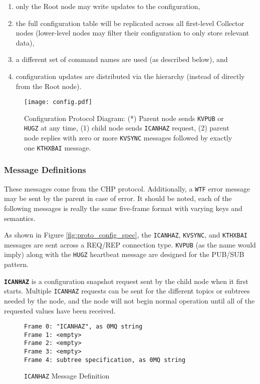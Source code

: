 \begin{enumerate}
\item only the Root node may write updates to the configuration,
\item the full configuration table will be replicated across all first-level Collector nodes (lower-level nodes may
      filter their configuration to only store relevant data),
\item a different set of command names are used (as described below), and
\item configuration updates are distributed via the \dcamp hierarchy (instead of directly from the Root node).
\end{enumerate}

\begin{figure}[H]
    \centering
    \texttt{[image: config.pdf]}
    \caption[Configuration Protocol Diagram]
	    {Configuration Protocol Diagram: (*) Parent node sends \texttt{KVPUB} or \texttt{HUGZ} at any time, (1)
	     child node sends \texttt{ICANHAZ} request, (2) parent node replies with zero or more \texttt{KVSYNC}
	     messages followed by exactly one \texttt{KTHXBAI} message.}
    \label{fig:proto_config_image}
\end{figure}

\subsubsection{Message Definitions}

These messages come from the CHP protocol. Additionally, a \texttt{WTF} error message may be sent by the parent in case
of error. It should be noted, each of the following messages is really the same five-frame format with varying keys and
semantics.

As shown in Figure \ref{fig:proto_config_spec}, the \texttt{ICANHAZ}, \texttt{KVSYNC}, and \texttt{KTHXBAI} messages are
sent across a REQ/REP connection type. \texttt{KVPUB} (as the name would imply) along with the \texttt{HUGZ} heartbeat
message are designed for the PUB/SUB pattern.

\textbf{\texttt{ICANHAZ}} is a configuration snapshot request sent by the child node when it first starts. Multiple
\texttt{ICANHAZ} requests can be sent for the different topics or subtrees needed by the node, and the node will not
begin normal operation until all of the requested values have been received.

\begin{figure}[H]
\vspace{+10pt}
\begin{verbatim}
Frame 0: "ICANHAZ", as 0MQ string
Frame 1: <empty>
Frame 2: <empty>
Frame 3: <empty>
Frame 4: subtree specification, as 0MQ string
\end{verbatim}
\vspace{-20pt}
\caption{\texttt{ICANHAZ} Message Definition}
\label{fig:message_icanhaz}
\end{figure}

